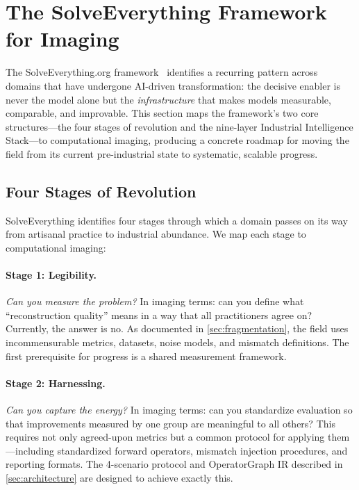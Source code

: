 
\section{The SolveEverything Framework for Imaging}
\label{sec:framework}

The SolveEverything.org framework~\cite{wissner2026solveeverything} identifies a
recurring pattern across domains that have undergone AI-driven
transformation: the decisive enabler is never the model alone but the
\emph{infrastructure} that makes models measurable, comparable, and
improvable.
This section maps the framework's two core structures---the four stages
of revolution and the nine-layer Industrial Intelligence Stack---to
computational imaging, producing a concrete roadmap for moving the field
from its current pre-industrial state to systematic, scalable progress.


\subsection{Four Stages of Revolution}
\label{sec:stages}

SolveEverything identifies four stages through which a domain passes
on its way from artisanal practice to industrial abundance.
We map each stage to computational imaging:

\paragraph{Stage 1: Legibility.}
\textit{Can you measure the problem?}
In imaging terms: can you define what ``reconstruction quality'' means
in a way that all practitioners agree on?
Currently, the answer is no.
As documented in \cref{sec:fragmentation}, the field uses
incommensurable metrics, datasets, noise models, and mismatch
definitions.
The first prerequisite for progress is a shared measurement framework.

\paragraph{Stage 2: Harnessing.}
\textit{Can you capture the energy?}
In imaging terms: can you standardize evaluation so that improvements
measured by one group are meaningful to all others?
This requires not only agreed-upon metrics but a common protocol for
applying them---including standardized forward operators, mismatch
injection procedures, and reporting formats.
The 4-scenario protocol and OperatorGraph IR described in
\cref{sec:architecture} are designed to achieve exactly this.

